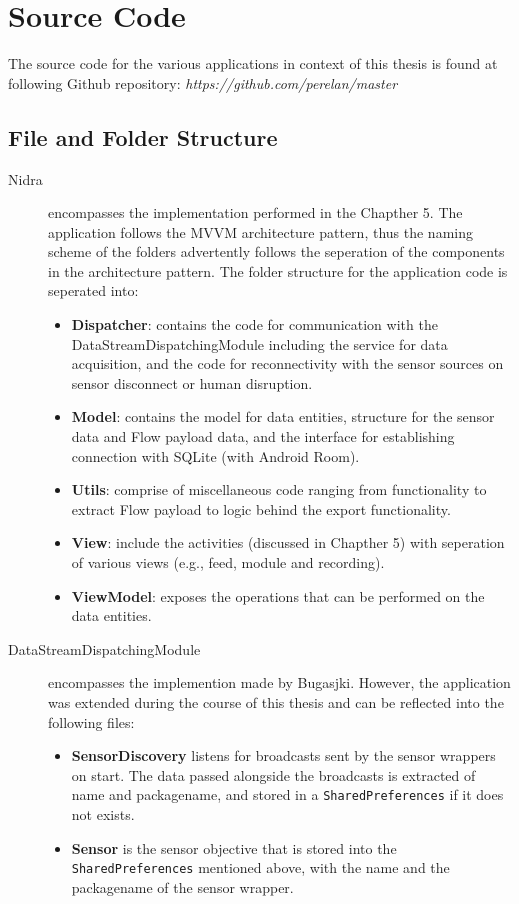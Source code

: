 \chapter{Source Code}
The source code for the various applications in context of this thesis is found at following Github repository: \textit{https://github.com/perelan/master}

\section{File and Folder Structure}
\begin{description}
    \item[Nidra] encompasses the implementation performed in the Chapther 5. The application follows the MVVM architecture pattern, thus the naming scheme of the folders advertently follows the seperation of the components in the architecture pattern. The folder structure for the application code is seperated into:
    \begin{itemize}
        \item \textbf{Dispatcher}: contains the code for communication with the DataStreamDispatchingModule including the service for data acquisition, and the code for reconnectivity with the sensor sources on sensor disconnect or human disruption.
        \item \textbf{Model}: contains the model for data entities, structure for the sensor data and Flow payload data, and the interface for establishing connection with SQLite (with Android Room).
        \item \textbf{Utils}: comprise of miscellaneous code ranging from functionality to extract Flow payload to logic behind the export functionality. 
        \item \textbf{View}: include the activities (discussed in Chapther 5) with seperation of various views (e.g., feed, module and recording). 
        \item \textbf{ViewModel}: exposes the operations that can be performed on the data entities. 
    \end{itemize}

    \item[DataStreamDispatchingModule] encompasses the implemention made by Bugasjki. However, the application was extended during the course of this thesis and can be reflected into the following files: 
    \begin{itemize}
        \item \textbf{SensorDiscovery} listens for broadcasts sent by the sensor wrappers on start. The data passed alongside the broadcasts is extracted of name and packagename, and stored in a \verb|SharedPreferences| if it does not exists. 
        \item \textbf{Sensor} is the sensor objective that is stored into the \verb|SharedPreferences| mentioned above, with the name and the packagename of the sensor wrapper. 
    \end{itemize}


\end{description}

